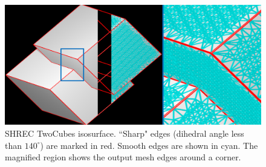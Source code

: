 \suppressfloats

\begin{figure}[t]
	\includegraphics[width=\linewidth]{images/shrecPerfect.eps}
	\caption{SHREC TwoCubes isosurface. 
``Sharp" edges (dihedral angle less than $140^\circ$) are marked in red. 
Smooth edges are shown in cyan. The magnified region shows the output mesh edges around a corner.}
	\label{fig:shrecPerfect1}
\end{figure}

